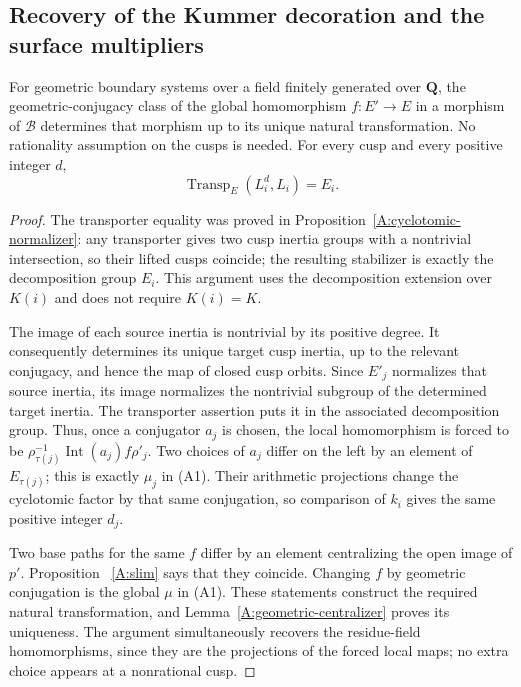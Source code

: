 \subsection{Recovery of the Kummer decoration and the surface multipliers}

\begin{proposition}
\label{A:boundary-recovery}
For geometric boundary systems over a field finitely
generated over $\mathbf Q$, the geometric-conjugacy
class of the global homomorphism $f:E'\to E$ in a
morphism of $\mathcal B$ determines that morphism up
to its unique natural transformation.  No rationality
assumption on the cusps is needed.  For every cusp
and every positive integer $d$,
\[
                   \operatorname{Transp}_E(L_i^d,L_i)=E_i.
\]
\end{proposition}
\begin{proof}
The transporter equality was proved in
Proposition~\ref{A:cyclotomic-normalizer}: any
transporter gives two cusp inertia groups with a
nontrivial intersection, so their lifted cusps coincide;
the resulting stabilizer is exactly the decomposition
group $E_i$.  This argument uses the decomposition
extension over $K(i)$ and does not require $K(i)=K$.

The image of each source inertia is nontrivial by its
positive degree.  It consequently determines its
unique target cusp inertia, up to the relevant
conjugacy, and hence the map of closed cusp orbits.
Since $E'_j$ normalizes that source inertia, its image
normalizes the nontrivial subgroup of the determined
target inertia.  The transporter assertion puts it
in the associated decomposition group.  Thus, once a
conjugator $a_j$ is chosen, the local homomorphism is
forced to be $\rho_{\tau(j)}^{-1}
\operatorname{Int}(a_j)f\rho'_j$.  Two choices of
$a_j$ differ on the left by an element of
$E_{\tau(j)}$; this is exactly $\mu_j$ in (A1).
Their arithmetic projections change the cyclotomic
factor by that same conjugation, so comparison of
$k_i$ gives the same positive integer $d_j$.

Two base paths for the same $f$ differ by an element
centralizing the open image of $p'$.  Proposition~
\ref{A:slim} says that they coincide.  Changing $f$
by geometric conjugation is the global $\mu$ in
(A1).  These statements construct the required natural
transformation, and Lemma~\ref{A:geometric-centralizer}
proves its uniqueness.  The argument simultaneously
recovers the residue-field homomorphisms, since they
are the projections of the forced local maps; no
extra choice appears at a nonrational cusp.
\end{proof}

